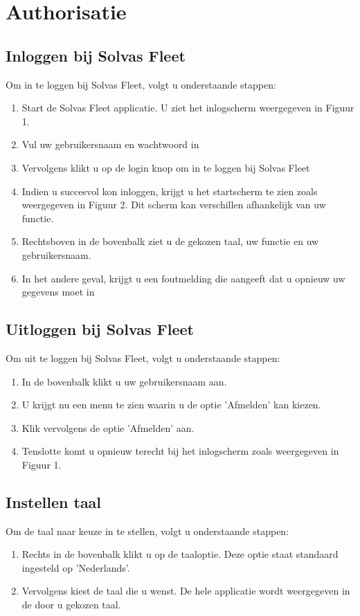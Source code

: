 \documentclass[11pt,openany]{article}
\begin{document}
\section{Authorisatie}
\subsection{Inloggen bij Solvas Fleet}
Om in te loggen bij Solvas Fleet, volgt u onderstaande stappen:
\begin{enumerate}
	\item Start de Solvas Fleet applicatie. U ziet het inlogscherm weergegeven in Figuur 1.
	\item Vul uw gebruikersnaam en wachtwoord in
	\item Vervolgens klikt u op de login knop om in te loggen bij Solvas Fleet
	\item Indien u succesvol kon inloggen, krijgt u het startscherm te zien zoals weergegeven in Figuur 2. Dit scherm kan verschillen afhankelijk van uw functie.
	\item Rechtsboven in de bovenbalk ziet u de gekozen taal, uw functie en uw gebruikersnaam.
	\item In het andere geval, krijgt u een foutmelding die aangeeft dat u opnieuw uw gegevens moet in
\end{enumerate}

\subsection{Uitloggen bij Solvas Fleet}
Om uit te loggen bij Solvas Fleet, volgt u onderstaande stappen:
\begin{enumerate}
	\item In de bovenbalk klikt u uw gebruikersnaam aan.
	\item U krijgt nu een menu te zien waarin u de optie 'Afmelden' kan kiezen.
	\item Klik vervolgens de optie 'Afmelden' aan.
	\item Tenslotte komt u opnieuw terecht bij het inlogscherm zoals weergegeven in Figuur 1.
\end{enumerate}

\subsection{Instellen taal}
Om de taal naar keuze in te stellen, volgt u onderstaande stappen:
\begin{enumerate}
	\item Rechts in de bovenbalk klikt u op de taaloptie. Deze optie staat standaard ingesteld op 'Nederlands'.
	\item Vervolgens kiest de taal die u wenst. De hele applicatie wordt weergegeven in de door u
	gekozen taal.
\end{enumerate}
\end{document}
